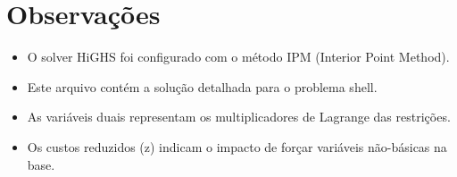 \documentclass[12pt]{article}
\begin{document}
\section{Observações}

\begin{itemize}
\item O solver HiGHS foi configurado com o método IPM (Interior Point Method).
\item Este arquivo contém a solução detalhada para o problema shell.
\item As variáveis duais representam os multiplicadores de Lagrange das restrições.
\item Os custos reduzidos (z) indicam o impacto de forçar variáveis não-básicas na base.
\end{itemize}
\end{document}

